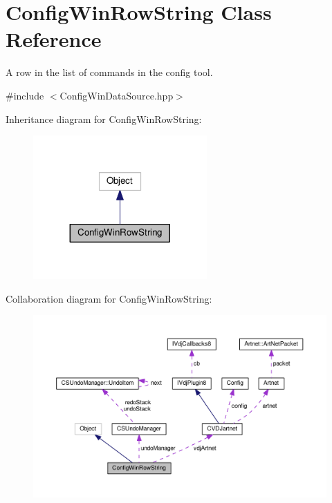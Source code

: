 \hypertarget{classConfigWinRowString}{}\section{Config\+Win\+Row\+String Class Reference}
\label{classConfigWinRowString}


A row in the list of commands in the config tool.  




{\ttfamily \#include $<$Config\+Win\+Data\+Source.\+hpp$>$}



Inheritance diagram for Config\+Win\+Row\+String\+:
\nopagebreak
\begin{figure}[H]
\begin{center}
\leavevmode
\includegraphics[width=188pt]{classConfigWinRowString__inherit__graph}
\end{center}
\end{figure}


Collaboration diagram for Config\+Win\+Row\+String\+:
\nopagebreak
\begin{figure}[H]
\begin{center}
\leavevmode
\includegraphics[width=350pt]{classConfigWinRowString__coll__graph}
\end{center}
\end{figure}
